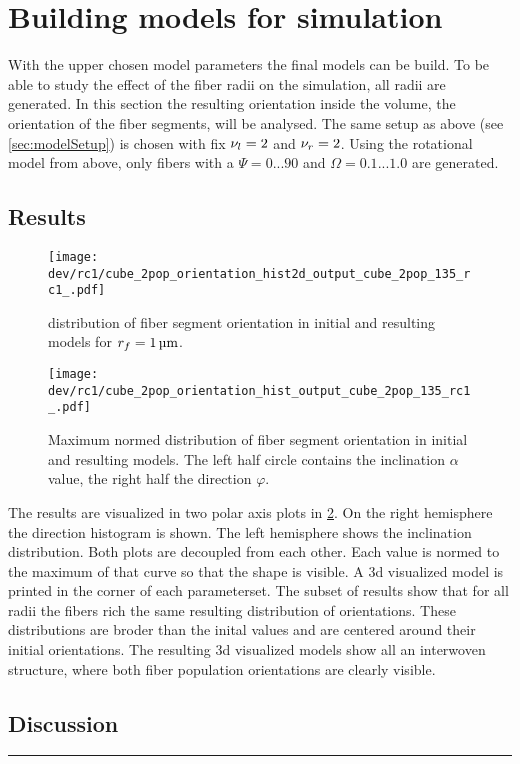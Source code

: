\section{Building models for simulation}
% 
With the upper chosen model parameters the final models can be build.
To be able to study the effect of the fiber radii on the simulation, all radii are generated.
In this section the resulting orientation inside the volume, \ie{} the orientation of the fiber segments, will be analysed.
The same setup as above (see \cref{sec:modelSetup}) is chosen with fix $\textnormal{$\nu_{l}$}=\SI{2}{}$ and $\textnormal{$\nu_{r}$} = \SI{2}{}$.
Using the rotational model from above, only fibers with a $\Psi =  0...90$ and $\Omega = 0.1...1.0$ are generated.
% 
\subsection{Results}
% 
\begin{figure}[!t]
\centering
\texttt{[image: dev/rc1/cube\_2pop\_orientation\_hist2d\_output\_cube\_2pop\_135\_rc1\_.pdf]}
\caption[Model orientation histograms]{distribution of fiber segment orientation in initial and resulting models for $\fiberRadius = \SI{1}{\micro\meter}$.  }
\label{fig:modelOrientation}
\end{figure}
% 
\begin{figure}[p]
\centering
\texttt{[image: dev/rc1/cube\_2pop\_orientation\_hist\_output\_cube\_2pop\_135\_rc1\_.pdf]}
\caption[Model orientation histograms]{Maximum normed distribution of fiber segment orientation in initial and resulting models. The left half circle contains the inclination $\alpha$ value, the right half the direction $\varphi$. }
\label{fig:modelOrientationHist1d}
\end{figure}
% 
The results are visualized in two polar axis plots in \cref{fig:modelOrientationHist1d}. On the right hemisphere the direction histogram is shown.
The left hemisphere shows the inclination distribution.
Both plots are decoupled from each other. 
Each value is normed to the maximum of that curve so that the shape is visible.
A 3d visualized model is printed in the corner of each parameterset.
% 
The subset of results show that for all radii the fibers rich the same resulting distribution of orientations. 
These distributions are broder than the inital values and are centered around their initial orientations.
The resulting 3d visualized models show all an interwoven structure, where both fiber population orientations are clearly visible. 
%  
\subsection{Discussion}
% 
\vspace{5pt}
\hrule
\vspace{6pt}
% 
